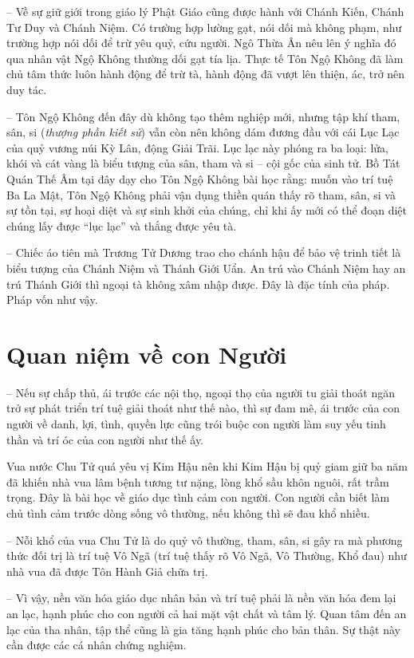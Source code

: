 -- Về sự giữ giới trong giáo lý Phật Giáo cũng được hành với Chánh Kiến, Chánh Tư Duy và Chánh Niệm. Có trường hợp lường gạt, nói dối mà không phạm, như trường hợp nói dối để trừ yêu quỷ, cứu người. Ngô Thừa Ân nêu lên ý nghĩa đó qua nhân vật Ngộ Không thường dối gạt tía lịa. Thực tế Tôn Ngộ Không đã làm chủ tâm thức luôn hành động để trừ tà, hành động đã vượt lên thiện, ác, trở nên duy tác.

-- Tôn Ngộ Không đến đây dù không tạo thêm nghiệp mới, nhưng tập khí tham, sân, si (\emph{thượng phần kiết sử}) vẫn còn nên không dám đương đầu với cái Lục Lạc của quỷ vương núi Kỳ Lân, động Giải Trãi. Lục lạc này phóng ra ba loại: lửa, khói và cát vàng là biểu tượng của sân, tham và si -- cội gốc của sinh tử. Bồ Tát Quán Thế Âm tại đây dạy cho Tôn Ngộ Không bài học rằng: muốn vào trí tuệ Ba La Mật, Tôn Ngộ Không phải vận dụng thiền quán thấy rõ tham, sân, si và sự tồn tại, sự hoại diệt và sự sinh khởi của chúng, chỉ khi ấy mới có thể đoạn diệt chúng lấy được ``lục lạc'' và thắng được yêu tà.

-- Chiếc áo tiên mà Trương Tử Dương trao cho chánh hậu để bảo vệ trinh tiết là biểu tượng của Chánh Niệm và Thánh Giới Uẩn. An trú vào Chánh Niệm hay an trú Thánh Giới thì ngoại tà không xâm nhập được. Đây là đặc tính của pháp. Pháp vốn như vậy.

\section{Quan niệm về con Người} %
\label{sec:68_69_con_nguoi}

-- Nếu sự chấp thủ, ái trước các nội thọ, ngoại thọ của người tu giải thoát ngăn trở sự phát triển trí tuệ giải thoát như thế nào, thì sự đam mê, ái trước của con người về danh, lợi, tình, quyền lực cũng trói buộc con người làm suy yếu tinh thần và trí óc của con người như thế ấy.

Vua nước Chu Tử quá yêu vị Kim Hậu nên khi Kim Hậu bị quỷ giam giữ ba năm đã khiến nhà vua lâm bệnh tương tư nặng, lòng khổ sầu khôn nguôi, rất trầm trọng. Đây là bài học về giáo dục tình cảm con người. Con người cần biết làm chủ tình cảm trước dòng sống vô thường, nếu không thì sẽ đau khổ nhiều.

-- Nỗi khổ của vua Chu Tử là do quỷ vô thường, tham, sân, si gây ra mà phương thức đối trị là trí tuệ Vô Ngã (trí tuệ thấy rõ Vô Ngã, Vô Thường, Khổ đau) như nhà vua đã được Tôn Hành Giả chữa trị.

-- Vì vậy, nền văn hóa giáo dục nhân bản và trí tuệ phải là nền văn hóa đem lại an lạc, hạnh phúc cho con người cả hai mặt vật chất và tâm lý. Quan tâm đến an lạc của tha nhân, tập thể cũng là gia tăng hạnh phúc cho bản thân. Sự thật này cần được các cá nhân chứng nghiệm.

